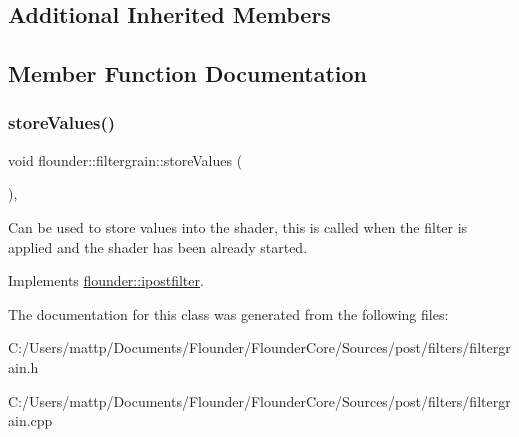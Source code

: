\subsection*{Additional Inherited Members}


\subsection{Member Function Documentation}
\mbox{\label{classflounder_1_1filtergrain_a0f65f9e8b994f18a4777e4451bdf8b4e}} 
\subsubsection{\texorpdfstring{store\+Values()}{storeValues()}}
{\footnotesize\ttfamily void flounder\+::filtergrain\+::store\+Values (\begin{DoxyParamCaption}{ }\end{DoxyParamCaption})\hspace{0.3cm}{\ttfamily [override]}, {\ttfamily [virtual]}}



Can be used to store values into the shader, this is called when the filter is applied and the shader has been already started. 



Implements \hyperlink{classflounder_1_1ipostfilter_a9b658b4672718d5ac36539875bde722e}{flounder\+::ipostfilter}.



The documentation for this class was generated from the following files\+:\begin{DoxyCompactItemize}
\item 
C\+:/\+Users/mattp/\+Documents/\+Flounder/\+Flounder\+Core/\+Sources/post/filters/filtergrain.\+h\item 
C\+:/\+Users/mattp/\+Documents/\+Flounder/\+Flounder\+Core/\+Sources/post/filters/filtergrain.\+cpp\end{DoxyCompactItemize}
